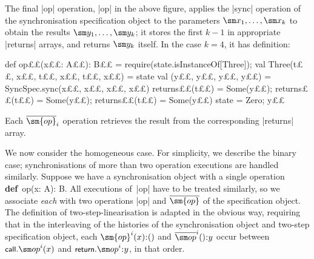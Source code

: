 %
The final |op| operation, |op| in the above figure, applies the |sync|
operation of the synchronisation specification object to the parameters $\sm
x_1, \ldots, \sm x_k$ to obtain the results $\sm y_1, \ldots, \sm y_k$; it
stores the first $k-1$ in appropriate |returns| arrays, and returns $\sm
y_k$ itself.  In the case $k=4$, it has definition:
%
\begin{scala}
  def op££(x££: A££): B££ = {
    require(state.isInstanceOf[Three]); val Three(t££, x££, t££, x££, t££, x££) = state
    val (y££, y££, y££, y££) = SyncSpec.sync(x££, x££, x££, x££) 
    returns££(t££) = Some(y££); returns££(t££) = Some(y££); returns££(t££) = Some(y££)
    state = Zero; y££
  }
\end{scala}
%
Each $\overline{\sm{op}}_i$ operation retrieves the result from the
corresponding |returns| array.



We now consider the homogeneous case.  For simplicity, we describe the binary
case; synchronisations of more than two operation executions are handled
similarly.  Suppose we have a synchronisation object with a single operation
{\bfseries\scalastyle def}~{\scalastyle op(x: A): B}.  All executions of~|op|
have to be treated similarly, so we associate \emph{each} with two operations
|op| and $\overline{\sm{op}}$ of the specification object.  
The definition of
two-step-linearisation is adapted in the obvious way, requiring that in the
interleaving of the histories of the synchronisation object and two-step
specification object, each $\sm{op}^{i}(x)\::()$ and $\overline\op^i()\::y$
occur between $\call.\op^i(x)$ and $\return.\op^i\::y$, in that order.

